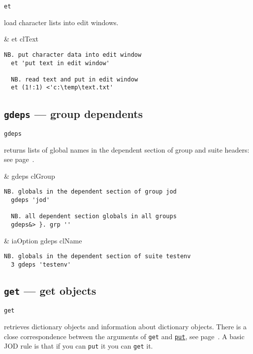 \hypertarget{il:et}{\texttt{et}} load character lists into edit windows.

\begin{wordhead}
\monad & et clText \\
\end{wordhead}
\begin{lstlisting}[frame=single,framerule=0pt]
  NB. put character data into edit window
  et 'put text in edit window' 

  NB. read text and put in edit window
  et (1!:1) <'c:\temp\text.txt' 
\end{lstlisting}

\subsection{\texttt{gdeps} --- group dependents}\label{ss:gdeps}

\hypertarget{il:gdeps}{\texttt{gdeps}} returns lists of global names 
in the dependent section of group and suite headers: see page~\pageref{ss:depsec}.

\begin{wordhead}
\monad & gdeps clGroup \\
\end{wordhead}
\begin{lstlisting}[frame=single,framerule=0pt]
  NB. globals in the dependent section of group jod
  gdeps 'jod'  
  
  NB. all dependent section globals in all groups
  gdeps&> }. grp ''
\end{lstlisting}

\begin{wordhead}
\dyad & iaOption gdeps clName \\
\end{wordhead}
\begin{lstlisting}[frame=single,framerule=0pt]
  NB. globals in the dependent section of suite testenv
  3 gdeps 'testenv'  
\end{lstlisting}

\subsection{\texttt{get} --- get objects}\label{ss:get}

\hypertarget{il:get}{\texttt{get}} retrieves dictionary objects and information 
about dictionary objects. 
There is a close correspondence between the arguments of \texttt{get} 
and \hyperlink{il:put}{\texttt{put}}, see page~\pageref{ss:put}. 
A basic JOD rule is that if you can \texttt{put} it you can \texttt{get} it.


